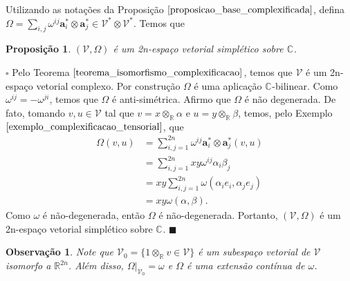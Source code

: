 \documentclass[12pt]{book}
\newtheorem{observacao}[teorema]{Observação}
\newtheorem{proposicao}[teorema]{Proposição}
\newenvironment{prova}[1]{$\square$ #1}{\hfill$\blacksquare$}
\newcommand{\complexificado}[1]{\mathcal{#1}}
\newcommand{\complexificacaoelemento}[2]{#1\otimes_{\reta} #2}
\newcommand{\complexo}[1]{\mathbb{C}^{#1}}
\newcommand{\formaSimpletica}[2]{\omega(#1, #2)}
\newcommand{\produtotensorialabrev}[2]{#1\otimes #2}
\newcommand{\produtotensorialdual}{\produtotensorialabrev{\complexificado{V}^{*}}{\complexificado{V}^{*}}}
\newcommand{\real}[1]{\mathbb{R}^{#1}}
\newcommand{\reta}{\real{}}
\begin{document}
	Utilizando as notações da Proposição $\ref{proposicao_base_complexificada}$, defina $\Omega=\sum_{i,j}\omega^{ij}\textbf{a}^{*}_{i}\otimes \textbf{a}^{*}_{j} \in \produtotensorialdual$. Temos que
	
	\begin{proposicao} $(\complexificado{V}, \Omega)$ é um 2n-espaço vetorial simplético sobre $\complexo{}$.
	\end{proposicao}\label{proposicao_complexificacao_espaco_simpletico}
	\begin{prova}
		Pelo Teorema $\ref{teorema_isomorfismo_complexificacao}$, temos que $\complexificado{V}$ é um 2n-espaço vetorial complexo. Por construção $\Omega$ é uma aplicação $\complexo{}$-bilinear. Como $\omega^{ij}  = -\omega^{ji} $, temos que $\Omega$ é anti-simétrica. Afirmo que $\Omega$ é não degenerada. De fato, tomando $v, u \in \complexificado{V}$ tal que $v= \complexificacaoelemento{x}{\alpha}$ e $u=\complexificacaoelemento{y}{\beta} $, temos, pelo Exemplo $\ref{exemplo_complexificacao_tensorial}$, que 
		$$
		\begin{aligned}
		\Omega(v,u) &= \sum_{i,j = 1}^{2n}
		\omega^{ij}\textbf{a}^{*}_{i}\otimes \textbf{a}^{*}_{j}(v,u)
		\\
		&= \sum_{i,j = 1}^{2n}
		xy\omega^{ij}\alpha_{i}\beta_{j}
		\\
		&= xy\sum_{i,j = 1}^{2n}
		\formaSimpletica{\alpha_{i}e_{i}}{\alpha_{j}e_{j}}
		\\
		&= xy\formaSimpletica{\alpha}{\beta}.
		\end{aligned}
		$$
		Como $\omega$ é não-degenerada, então $\Omega$ é não-degenerada. Portanto, $(\complexificado{V}, \Omega)$ é um 2n-espaço vetorial simplético sobre $\complexo{}$.
	\end{prova}
	
	\begin{observacao}
		Note que $\complexificado{V}_{0} = \{\complexificacaoelemento{1}{v} \in \complexificado{V} \}$ é um subespaço vetorial de $\complexificado{V}$ isomorfo a $\real{2n}$. Além disso, $\Omega|_{\complexificado{V}_{0}} = \omega$ e $\Omega$ é uma extensão contínua de $\omega$.
	\end{observacao}
	
\end{document}
